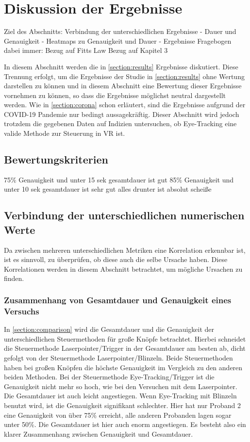 
\chapter{Diskussion der Ergebnisse}
Ziel des Abschnitts:
	Verbindung der unterschiedlichen Ergebnisse
		- Dauer und Genauigkeit
		- Heatmaps zu Genauigkeit und Dauer
		- Ergebnisse Fragebogen
	dabei immer:	
		Bezug auf Fitts Law
		Bezug auf Kapitel 3

In diesem Abschnitt werden die in \autoref{section:results} Ergebnisse diskutiert. Diese Trennung erfolgt, um die Ergebnisse der Studie in \autoref{section:results} ohne Wertung darstellen zu können und in diesem Abschnitt eine Bewertung dieser Ergebnisse vornehmen zu können, so dass die Ergebnisse möglichst neutral dargestellt werden. Wie in \autoref{section:corona} schon erläutert, sind die Ergebnisse aufgrund der COVID-19 Pandemie nur bedingt aussagekräftig. Dieser Abschnitt wird jedoch trotzdem die gegebenen Daten auf Indizien untersuchen, ob Eye-Tracking eine valide Methode zur Steuerung in VR ist. 

\section{Bewertungskriterien}
75\% Genauigkeit und unter 15 sek gesamtdauer ist gut
85\% Genauigkeit und unter 10 sek gesamtdauer ist sehr gut
alles drunter ist absolut scheiße

\section{Verbindung der unterschiedlichen numerischen Werte}
Da zwischen mehreren unterschiedlichen Metriken eine Korrelation erkennbar ist, ist es sinnvoll, zu überprüfen, ob diese auch die selbe Ursache haben. Diese Korrelationen werden in diesem Abschnitt betrachtet, um mögliche Ursachen zu finden.

\subsection{Zusammenhang von Gesamtdauer und Genauigkeit eines Versuchs}
In \autoref{section:comparison} wird die Gesamtdauer und die Genauigkeit der unterschiedlichen Steuermethoden für große Knöpfe betrachtet. Hierbei schneidet die Steuermethode Laserpointer/Trigger in der Gesamtdauer am besten ab, dicht gefolgt von der Steuermethode Laserpointer/Blinzeln. Beide Steuermethoden haben bei großen Knöpfen die höchste Genauigkeit im Vergleich zu den anderen beiden Methoden. Bei der Steuermethode Eye-Tracking/Trigger ist die Genauigkeit nicht mehr so hoch, wie bei den Versuchen mit dem Laserpointer. Die Gesamtdauer ist auch leicht angestiegen. Wenn Eye-Tracking  mit Blinzeln benutzt wird, ist die Genauigkeit signifikant schlechter. Hier hat nur Proband 2 eine Genauigkeit von über 75\% erreicht, alle anderen Probanden lagen sogar unter 50\%. Die Gesamtdauer ist hier auch enorm angestiegen. Es besteht also ein klarer Zusammenhang zwischen Genauigkeit und Gesamtdauer. 

